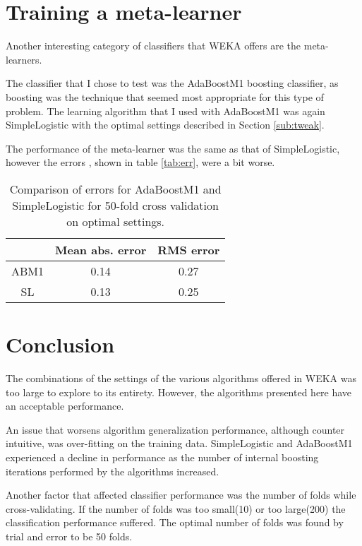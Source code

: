 \documentclass[12pt,twocolumn,a4paper]{article}
\begin{document}
\section{Training a meta-learner}
Another interesting category of classifiers that WEKA offers are the meta-learners. 

The classifier that I chose to test was the AdaBoostM1 boosting classifier, as boosting was the technique that seemed most appropriate for this type of problem. The learning algorithm that I used with AdaBoostM1 was again SimpleLogistic with the optimal settings described in Section \ref{sub:tweak}.

The performance of the meta-learner was the same as that of SimpleLogistic, however the errors , shown in table \ref{tab:err}, were a bit worse.

\begin{table}
\centering
\begin{tabular}{c | c | c }
    & \textbf{Mean abs. error} & \textbf{RMS error} \\ \hline
    ABM1 & 0.14 & 0.27 \\
    SL & 0.13 & 0.25 \\
\end{tabular}
\caption{Comparison of errors for AdaBoostM1 and SimpleLogistic for 50-fold cross validation on optimal settings.}   
\label{tab:comp}
\end{table}

\section{Conclusion}
The combinations of the settings of the various algorithms offered in WEKA was too large to explore to its entirety. However, the algorithms presented here have an acceptable performance.

An issue that worsens algorithm generalization performance, although counter intuitive, was over-fitting on the training data. SimpleLogistic and AdaBoostM1 experienced a decline in performance as the number of internal boosting iterations performed by the algorithms increased. 

Another factor that affected classifier performance was the number of folds while cross-validating. If the number of folds was too small(10) or too large(200) the classification performance suffered. The optimal number of folds was found by trial and error to be 50 folds.



\end{document}
